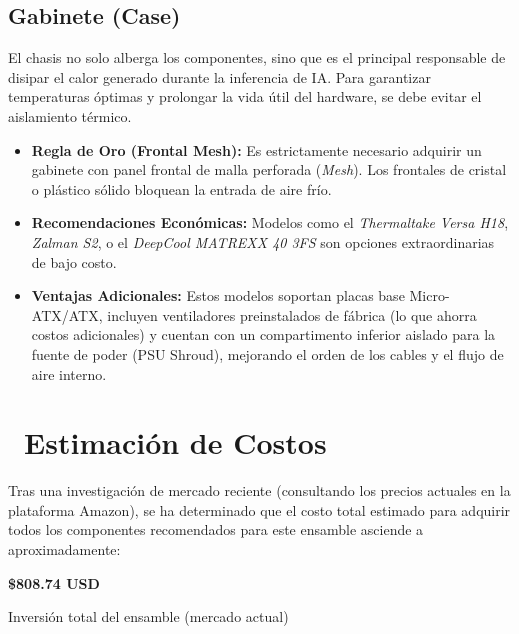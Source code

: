 \documentclass[11pt,a4paper]{article}
\newcommand{\iconotexto}[2]{\textcolor{cyanNeon}{\faIcon{#1}}~#2}
\begin{document}
\subsection{Gabinete (Case)}

El chasis no solo alberga los componentes, sino que es el principal responsable de disipar el calor generado durante la inferencia de IA. Para garantizar temperaturas óptimas y prolongar la vida útil del hardware, se debe evitar el aislamiento térmico.

\begin{tcolorbox}[cajaRecomendacion, title={\faIcon{box-open}~Gabinete (Case)}]
\begin{itemize}
    \item \textbf{Regla de Oro (Frontal Mesh):} Es estrictamente necesario adquirir un gabinete con panel frontal de malla perforada (\textit{Mesh}). Los frontales de cristal o plástico sólido bloquean la entrada de aire frío.
    \item \textbf{Recomendaciones Económicas:} Modelos como el \textit{Thermaltake Versa H18}, \textit{Zalman S2}, o el \textit{DeepCool MATREXX 40 3FS} son opciones extraordinarias de bajo costo.
    \item \textbf{Ventajas Adicionales:} Estos modelos soportan placas base Micro-ATX/ATX, incluyen ventiladores preinstalados de fábrica (lo que ahorra costos adicionales) y cuentan con un compartimento inferior aislado para la fuente de poder (PSU Shroud), mejorando el orden de los cables y el flujo de aire interno.
\end{itemize}
\end{tcolorbox}

\section[Estimación de Costos]{\iconotexto{dollar-sign}{Estimación de Costos}}

Tras una investigación de mercado reciente (consultando los precios actuales en la plataforma Amazon), se ha determinado que el costo total estimado para adquirir todos los componentes recomendados para este ensamble asciende a aproximadamente:

\begin{tcolorbox}[tarjetaDato, title={\faIcon{coins}~Costo total estimado}]
\centering
{\fontsize{28}{34}\selectfont\bfseries\color{azulNoche}\$808.74 USD}\par\vspace{4pt}
{\color{grisTexto}\small Inversión total del ensamble (mercado actual)}
\end{tcolorbox}
\end{document}
